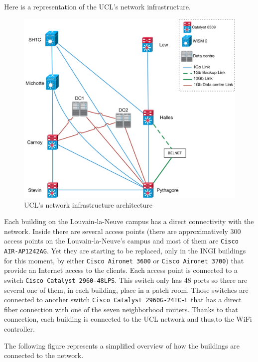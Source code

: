 Here is a representation of the UCL's network infrastructure.

\begin{figure}[H]
	\includegraphics[width=1\linewidth]{Pictures/Chapter2/ucl.png}
	\caption{UCL's network infrastructure architecture}
\end{figure}


Each building on the Louvain-la-Neuve campus has a direct connectivity with the network. Inside there are several access points (there are approximatively 300 access points on the Louvain-la-Neuve's campus and most of them are \texttt{Cisco AIR-AP1242AG}. Yet they are starting to be replaced, only in the INGI buildings for this moment, by either \texttt{Cisco Aironet 3600} or \texttt{Cisco Aironet 3700}) that provide an Internet access to the clients. Each access point is connected to a switch \texttt{Cisco Catalyst 2960-48LPS}. This switch only has 48 ports so there are several one of them, in each building, place in a patch room. Those switches are connected to another switch \texttt{Cisco Catalyst 2960G-24TC-L} that has a direct fiber connection with one of the seven neighborhood routers. Thanks to that connection, each building is connected to the UCL network and thus,to the WiFi controller.

The following figure represents a simplified overview of how the buildings are connected to the network.

